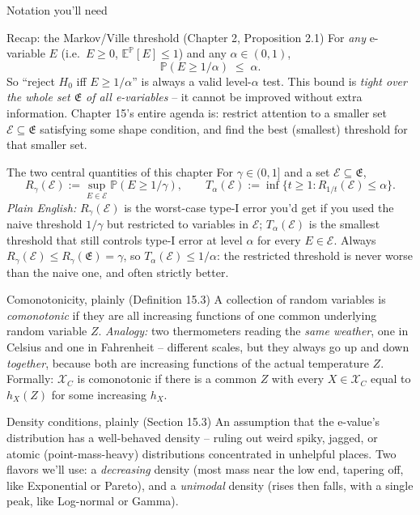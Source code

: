 \documentclass[aspectratio=169,10pt]{beamer}
\newcommand{\PP}{\mathbb{P}}
\newcommand{\EE}{\mathbb{E}}
\newcommand{\calE}{\mathcal{E}}
\newcommand{\calX}{\mathcal{X}}
\newcommand{\frakE}{\mathfrak{E}}
\begin{document}
\begin{frame}[allowframebreaks]{Notation you'll need}
  \begin{block}{Recap: the Markov/Ville threshold (Chapter 2, Proposition 2.1)}
    For \emph{any} e-variable $E$ (i.e.\ $E\ge0$, $\EE^\PP[E]\le1$) and any $\alpha\in(0,1)$,
    \[
      \PP(E\ge 1/\alpha)\;\le\;\alpha.
    \]
    So ``reject $H_0$ iff $E\ge 1/\alpha$'' is always a valid level-$\alpha$ test. This bound is \emph{tight over the whole set $\frakE$ of all e-variables} -- it cannot be improved without extra information. Chapter 15's entire agenda is: restrict attention to a smaller set $\calE\subseteq\frakE$ satisfying some shape condition, and find the best (smallest) threshold for that smaller set.
  \end{block}

  \begin{block}{The two central quantities of this chapter}
    For $\gamma\in(0,1]$ and a set $\calE\subseteq\frakE$,
    \[
      R_\gamma(\calE) := \sup_{E\in\calE}\PP(E\ge 1/\gamma), \qquad
      T_\alpha(\calE) := \inf\{t\ge 1 : R_{1/t}(\calE)\le\alpha\}.
    \]
    \emph{Plain English:} $R_\gamma(\calE)$ is the worst-case type-I error you'd get if you used the naive threshold $1/\gamma$ but restricted to variables in $\calE$; $T_\alpha(\calE)$ is the smallest threshold that still controls type-I error at level $\alpha$ for every $E \in \calE$. Always $R_\gamma(\calE)\le R_\gamma(\frakE)=\gamma$, so $T_\alpha(\calE)\le 1/\alpha$: the restricted threshold is never worse than the naive one, and often strictly better.
  \end{block}

  \framebreak

  \begin{block}{Comonotonicity, plainly (Definition 15.3)}
    A collection of random variables is \emph{comonotonic} if they are all increasing functions of one common underlying random variable $Z$. \emph{Analogy:} two thermometers reading the \emph{same weather}, one in Celsius and one in Fahrenheit -- different scales, but they always go up and down \emph{together}, because both are increasing functions of the actual temperature $Z$. Formally: $\calX_C$ is comonotonic if there is a common $Z$ with every $X\in\calX_C$ equal to $h_X(Z)$ for some increasing $h_X$.
  \end{block}

  \begin{block}{Density conditions, plainly (Section 15.3)}
    An assumption that the e-value's distribution has a well-behaved density -- ruling out weird spiky, jagged, or atomic (point-mass-heavy) distributions concentrated in unhelpful places. Two flavors we'll use: a \emph{decreasing} density (most mass near the low end, tapering off, like Exponential or Pareto), and a \emph{unimodal} density (rises then falls, with a single peak, like Log-normal or Gamma).
  \end{block}


\end{frame}
\end{document}
